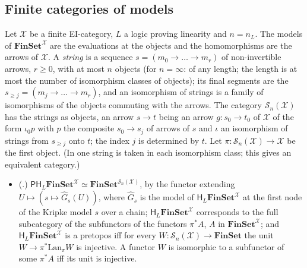 \documentclass[11pt]{amsart}
\theoremstyle{definition}
\newcommand{\Fin}{\mathbf{FinSet}}
\newcommand{\Lan}{\mathrm{Lan}}
\newcommand{\PP}{\mathsf P}
\newcommand{\HH}{\mathsf H}
\newcommand{\cX}{\mathcal X}
\newcommand{\cS}{\mathcal S}
\begin{document}
\subsection*{Finite categories of models}
Let $\cX$ be a finite EI-category, $L$ a logic proving linearity and
$n=n_L$. The models of $\Fin^\cX$ are the evaluations at the objects
and the homomorphisms are the arrows of $\cX$. A \emph{string} is a
sequence $s=(m_0\to\dots\to m_r)$ of non-invertible arrows, $r\ge0$,
with at most $n$ objects (for $n=\infty$: of any length; the length is
at most the number of isomorphism classes of objects); its final segments are the $s_{\ge
j}=(m_j\to\dots\to m_r)$, and an isomorphism of strings is a family of
isomorphisms of the objects commuting with the arrows. The category
$\cS_n(\cX)$ has the strings as objects, an arrow $s\to t$ being an
arrow $g\colon s_0\to t_0$ of $\cX$ of the form $\iota_0p$ with $p$
the composite $s_0\to s_j$ of arrows of $s$ and $\iota$ an isomorphism
of strings from $s_{\ge j}$ onto $t$; the index $j$ is determined by
$t$. Let $\pi\colon\cS_n(\cX)\to\cX$ be the first object. (In
\cite{Strings} one string is taken in each isomorphism class; this
gives an equivalent category.)

\begin{itemize}
\item[(R5)] (\cite[Thm.~1.1]{Strings}.) $\PP\HH_L\Fin^\cX\simeq
\Fin^{\cS_n(\cX)}$, by the functor extending $U\mapsto(s\mapsto\hat
G_s(U))$, where $\hat G_s$ is the model of $\HH_L\Fin^\cX$ at the
first node of the Kripke model $s$ over a chain; $\HH_L\Fin^\cX$
corresponds to the full subcategory of the subfunctors of the functors
$\pi^*A$, $A$ in $\Fin^\cX$; and $\HH_L\Fin^\cX$ is a pretopos iff for
every $W\colon\cS_n(\cX)\to\Fin$ the unit $W\to\pi^*\Lan_\pi W$ is
injective. A functor $W$ is isomorphic to a subfunctor of some
$\pi^*A$ iff its unit is injective.
\end{itemize}
\end{document}
